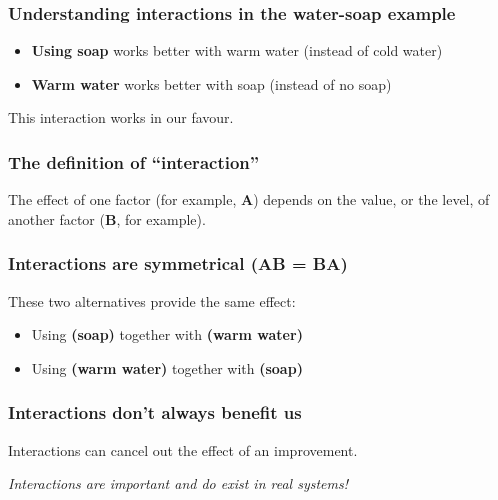 \documentclass[handout,11pt,aspectratio=169,mathserif]{beamer}
\begin{document}
\begin{frame}\frametitle{Understanding interactions in the water-soap example}
	\begin{itemize}
		\item	\textbf{Using soap} works better with warm water (instead of cold water)

		
		\vspace{24pt}
		\pause
		\item	\textbf{Warm water} works better with soap (instead of no soap)
			
	\end{itemize}
	\pause
	\vspace{24pt}
	This interaction works in our favour.
\end{frame}

\begin{frame}\frametitle{The definition of ``interaction''}
	\begin{exampleblock}{}
		The effect of one factor (for example, \textbf{A}) depends on the value, or the level, of another factor (\textbf{B}, for example).
	\end{exampleblock}
\end{frame}

\begin{frame}\frametitle{Interactions are symmetrical (\textbf{AB} = \textbf{BA})}
	These two alternatives provide the same effect: \vspace{24pt}
	\begin{itemize}
		\item	Using \textbf{(soap)} together with \textbf{(warm water)} 
		\vspace{12pt}
		\item	Using \textbf{(warm water)} together with \textbf{(soap)}  
	\end{itemize}
\end{frame}

\begin{frame}\frametitle{Interactions don't always benefit us}
	
	Interactions can cancel out the effect of an improvement. 
	
	\vspace{24pt}
	{\color{myOrange} 	\emph{Interactions are important and do exist in real systems!}}
\end{frame}
\end{document}
